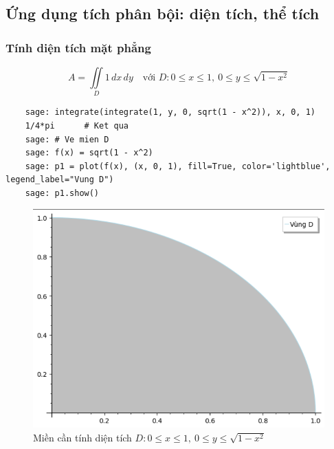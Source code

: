 \subsection{Ứng dụng tích phân bội: diện tích, thể tích}
\subsubsection{Tính diện tích mặt phẳng}
\[ A = \iint\limits_D 1 \, dx \, dy \quad \text{với } D: 0 \le x \le 1, \ 0 \le y \le \sqrt{1 - x^2} \]
\begin{lstlisting}
	sage: integrate(integrate(1, y, 0, sqrt(1 - x^2)), x, 0, 1)
	1/4*pi		# Ket qua
	sage: # Ve mien D
	sage: f(x) = sqrt(1 - x^2)
	sage: p1 = plot(f(x), (x, 0, 1), fill=True, color='lightblue', legend_label="Vung D")
	sage: p1.show()
\end{lstlisting}
\begin{figure}[H]
	\centering
	\includegraphics[width=0.7\linewidth]{images/5221}
	\caption{Miền cần tính diện tích $D: 0 \le x \le 1, \ 0 \le y \le \sqrt{1 - x^2}$}
	\label{fig:5221}
\end{figure}

